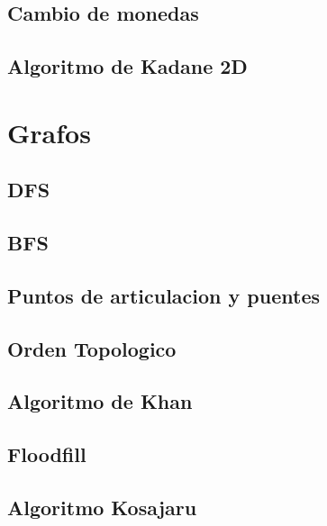 \subsection{Cambio de monedas}
\raggedbottom
\hrulefill
\subsection{Algoritmo de Kadane 2D}
\raggedbottom
\hrulefill

\section{Grafos}
\subsection{DFS}
\raggedbottom
\hrulefill
\subsection{BFS}
\raggedbottom
\hrulefill
\subsection{Puntos de articulacion y puentes}
\raggedbottom
\hrulefill
\subsection{Orden Topologico}
\raggedbottom
\hrulefill
\subsection{Algoritmo de Khan}
\raggedbottom
\hrulefill
\subsection{Floodfill}
\raggedbottom
\hrulefill
\subsection{Algoritmo Kosajaru}
\raggedbottom
\hrulefill
